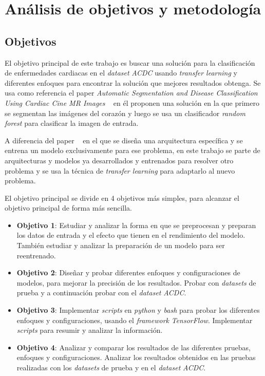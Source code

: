 \documentclass[12pt,a4paper]{article}
\begin{document}
\newpage
\section{Análisis de objetivos y metodología}
\subsection{Objetivos}
El objetivo principal de este trabajo es buscar una solución para la clasificación de enfermedades cardiacas en el \textit{dataset} \textit{ACDC} usando \textit{transfer learning} y diferentes enfoques para encontrar la solución que mejores resultados obtenga. Se usa como referencia el paper \textit{Automatic Segmentation and Disease Classification Using Cardiac Cine MR Images} ~\cite{DBLP:journals/corr/abs-1708-01141} en él proponen una solución en la que primero se segmentan las imágenes del corazón y luego se usa un clasificador \textit{random forest} para clasificar la imagen de entrada.
\bigskip

A diferencia del paper ~\cite{DBLP:journals/corr/abs-1708-01141} en el que se diseña una arquitectura específica y se entrena un modelo exclusivamente para ese problema, en este trabajo se parte de arquitecturas y modelos ya desarrollados y entrenados para resolver otro problema y se usa la técnica de \textit{transfer learning} para adaptarlo al nuevo problema.
\bigskip

El objetivo principal se divide en 4 objetivos más simples, para alcanzar el objetivo principal de forma más sencilla.

\begin{itemize}
\item \textbf{Objetivo 1}: Estudiar y analizar la forma en que se preprocesan y preparan los datos de entrada y el efecto que tienen en el rendimiento del modelo. También estudiar y analizar la preparación de un modelo para ser reentrenado.

\item \textbf{Objetivo 2}: Diseñar y probar diferentes enfoques y configuraciones de modelos, para mejorar la precisión de los resultados. Probar con \textit{datasets} de prueba y a continuación probar con el \textit{dataset} \textit{ACDC}.

\item \textbf{Objetivo 3}: Implementar \textit{scripts} en \textit{python} y \textit{bash} para probar los diferentes enfoques y configuraciones, usando el \textit{framework} \textit{TensorFlow}. Implementar \textit{scripts} para resumir y analizar la información.

\item \textbf{Objetivo 4}: Analizar y comparar los resultados de las diferentes pruebas, enfoques y configuraciones. Analizar los resultados obtenidos en las pruebas realizadas con los \textit{datasets} de prueba y en el \textit{dataset} \textit{ACDC}.
\end{itemize}
\end{document}
